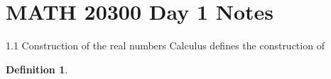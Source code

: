 \documentclass[11pt]{article}
\theoremstyle{definition}
\newtheorem{definition}{Definition}
\theoremstyle{plain}
\theoremstyle{remark}
\begin{document}
\section*{MATH 20300 Day 1 Notes}

1.1 Construction of the real numbers
Calculus defines the construction of \
\begin{definition}
    
\end{definition}
\end{document}
